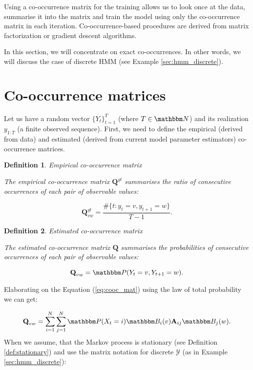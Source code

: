 \documentclass[shortabstract]{iithesis}
\newtheorem{definition}{Definition}
\begin{document}
Using a co-occurrence matrix for the training allows us to look once at the data, summarise it into the matrix and train the model using only the co-occurrence matrix in each iteration. Co-occurrence-based procedures are derived from matrix factorization or gradient descent algorithms. 

In this section, we will concentrate on exact co-occurrences. In other words, we will discuss the case of discrete HMM  (see Example \ref{sec:hmm_discrete}). 

\section{Co-occurrence matrices} \label{sec:cooc_mat}

Let us have a random vector $\{ Y_t\}_{t=1}^T$ (where $T \in \mathbbm N$) and its realization $y_{1:T}$ (a finite observed sequence). First, we need to define the empirical (derived from data) \linebreak and estimated (derived from current model parameter estimators) co-occurrence matrices.


\begin{definition}{Empirical co-occurrence matrix}

The empirical co-occurrence matrix $\textbf{Q}^{gt}$ summarises  the ratio of consecutive occurrences of each pair of observable values: 

\begin{equation}\label{eq:cooc_gt}
    \textbf{Q}^{gt}_{vw} = \frac {\#\{t: y_t =  v, y_{t+1} = w\}} {T-1}\text{.}
\end{equation}
\end{definition}

\pagebreak

\begin{definition}{Estimated co-occurrence matrix}

The estimated co-occurrence matrix $\textbf{Q}$ summarises  the probabilities of consecutive occurrences of each pair of observable values: 

\begin{equation}\label{eq:cooc_mat}
    \textbf{Q}_{vw} = \mathbbm P (Y_t =  v, Y_{t+1} = w) \text{.}
\end{equation}
\end{definition}

Elaborating on the Equation (\ref{eq:cooc_mat}) using the law of total probability we can get:


\begin{equation*} %
    \textbf{Q}_{vw} = \sum_{i =1}^N \sum_{j =1}^N \mathbbm P (X_t = i) \mathbbm B_i (v) \textbf{A}_{ij}  \mathbbm B_j (w)\text{.}
\end{equation*}
\linebreak
When we assume, that the Markov process is stationary (see Definition \ref{def:stationary}) and use the matrix notation for discrete $\mathcal Y$ (as in Example \ref{sec:hmm_discrete}):
\end{document}
